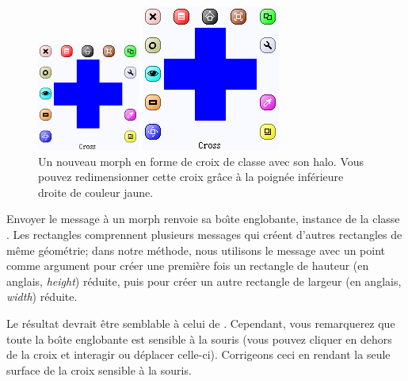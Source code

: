 \documentclass[a4paper,10pt,twoside]{book}
\begin{document}
\begin{figure}[hbt]
	\ifluluelse
		{\centerline{\includegraphics[width=0.3\textwidth]{NewCross}}}
		{\centerline{\includegraphics{NewCross}}}
	\caption{Un nouveau morph en forme de croix de classe
       avec son halo. Vous pouvez redimensionner cette
      croix gr\^ace \`a la poign\'ee inf\'erieure droite
      de couleur jaune.\label{fig:cross}}
\end{figure}

Envoyer le message  \`a un morph renvoie sa
bo\^{\i}te englobante, instance de la classe .  Les
rectangles comprennent plusieurs messages qui cr\'eent d'autres
rectangles de m\^eme g\'eom\'etrie; %
dans notre m\'ethode, nous utilisons le message  avec un
point comme argument pour cr\'eer une premi\`ere fois un rectangle de
hauteur (en anglais, \emph{height}) r\'eduite, puis pour cr\'eer un
autre rectangle de largeur (en anglais, \emph{width}) r\'eduite.

Le r\'esultat devrait \^etre semblable \`a celui de .
Cependant, vous remarquerez que toute la bo\^{\i}te englobante est
sensible \`a la souris (vous pouvez cliquer en dehors de la croix et
interagir ou d\'eplacer celle-ci). Corrigeons ceci en rendant la seule
surface de la croix sensible \`a la souris.
\end{document}
